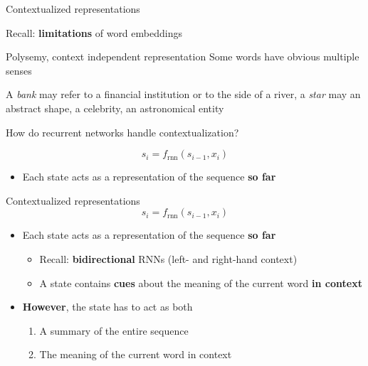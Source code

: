 \documentclass[12pt,aspectratio=169,handout]{beamer}
\begin{document}
\begin{frame}{Contextualized representations}

Recall: \textbf{limitations} of word embeddings
\begin{block}{Polysemy, context independent representation}
	Some words have obvious multiple senses
	
	A \emph{bank} may refer to a financial institution or to the side of a river, a \emph{star} may an abstract shape, a celebrity, an astronomical entity
\end{block}
	
\pause

How do recurrent networks handle contextualization?

\pause
$$
s_i = f_{\text{rnn}} (s_{i-1}, x_i)
$$

\begin{itemize}
	\item Each state acts as a representation of the sequence \textbf{so far}
	\pause
\end{itemize}

\end{frame}

\begin{frame}{Contextualized representations}
	$$
	s_i = f_{\text{rnn}} (s_{i-1}, x_i)
	$$
	
	\begin{itemize}
		\item Each state acts as a representation of the sequence \textbf{so far}
		\pause
		\begin{itemize}
			\item Recall: \textbf{bidirectional} RNNs (left- and right-hand context)
			\item A state contains \textbf{cues} about the meaning of the current word \textbf{in context}
			\pause
		\end{itemize}
		\vspace{1em}
		\item \textbf{However}, the state has to act as both
		\begin{enumerate}
			\item A summary of the entire sequence
			\item The meaning of the current word in context
		\end{enumerate}
	\end{itemize}

\end{frame}
\end{document}
